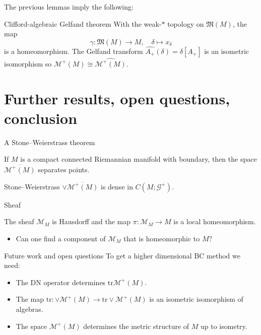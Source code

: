 \documentclass[aspectratio=169,handout]{beamer}
\newcommand{\trace}{\mathrm{tr}}
\newcommand{\G}{\mathcal{G}}
\newcommand{\characters}{\mathfrak{M}}
\newcommand{\monogenics}{\mathcal{M}}
\begin{document}
\begin{frame}{}
\vfill
The previous lemmas imply the following:
\pause
\begin{thm*}{Clifford-algebraic Gelfand theorem}{}
With the weak-$\ast$ topology on $\characters(M)$, the map
\[
\gamma \colon \characters(M) \to M, \quad \delta \mapsto x_\delta
\]
is a homeomorphism. The Gelfand transform $\widehat{A_+}(\delta)=\delta[A_+]$ is an isometric isomorphism so $\monogenics^+(M) \cong \widehat{\monogenics^+(M)}$.
\end{thm*}
\vfill
\end{frame}




\section{Further results, open questions, conclusion}
%
  \begin{frame}{A Stone--Weierstrass theorem}{}
\vfill
\begin{lemm*}
If $M$ is a compact connected Riemannian manifold with boundary, then the space $\overline{\monogenics^+(M)}$ separates points.
\end{lemm*}

\begin{thm*}{Stone--Weierstrass}{}
$\vee \overline{\monogenics^+(M)}$ is dense in $C(M;\G^+)$.
\end{thm*}
\vfill
\end{frame}

\begin{frame}{Sheaf}
\vfill
\begin{thm*}{}{}
The sheaf $\monogenics_M$ is Hausdorff and the map $\pi \colon \monogenics_M \to M$ is a local homeomorphism.
\end{thm*}
\begin{itemize}
  \item Can one find a component of $\monogenics_M$ that is homeomorphic to $M$?
\end{itemize}
\vfill
\end{frame}


\begin{frame}{Future work and open questions}
\vfill
To get a higher dimensional BC method we need:
\begin{itemize}
  \item The DN operator determines $\trace \monogenics^+(M)$.
  \item The map $\trace \colon \vee \monogenics^+(M) \to \trace \vee \monogenics^+(M)$ is an isometric isomorphism of algebras.
  \item The space $\monogenics^+(M)$ determines the metric structure of $M$ up to isometry.
\end{itemize}
\vfill
\end{frame}
\end{document}
